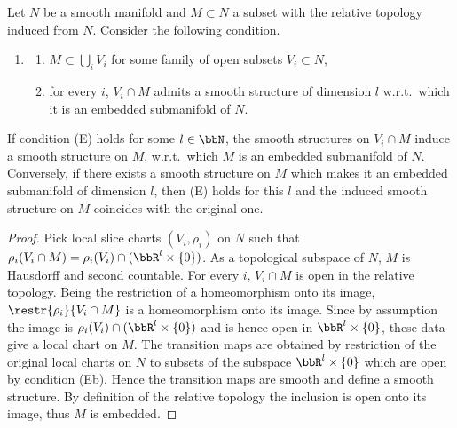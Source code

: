 \begin{lem}\label{prop 1.7.3 RS1}
    Let $N$ be a smooth manifold and $M\subset N$ a subset with the relative topology induced from $N$. Consider the following condition.
    \begin{enumerate}[label=(E)]
        \item \begin{enumerate}[label=(E\alph*)]
            \item $M\subset \bigcup_i V_i$ for some family of open subsets $V_i\subset N$,
            \item for every $i$, $V_i\cap M$ admits a smooth structure of dimension $l$ w.r.t.\ which it is an embedded submanifold of $N$.
        \end{enumerate}
    \end{enumerate}
    If condition (E) holds for some $l\in\bbN$, the smooth structures on $V_i\cap M$ induce a smooth structure on $M$, w.r.t.\ which $M$ is an embedded submanifold of $N$. Conversely, if there exists a smooth structure on $M$ which makes it an embedded submanifold of dimension $l$, then (E) holds for this $l$ and the induced smooth structure on $M$ coincides with the original one.
\end{lem}
\begin{proof}
    Pick local slice charts $(V_i,\rho_i)$ on $N$ such that $\rho_i(V_i\cap M)=\rho_i(V_i)\cap (\bbR^l\times \{0\})$. As a topological subspace of $N$, $M$ is Hausdorff and second countable. For every $i$, $V_i\cap M$ is open in the relative topology. Being the restriction of a homeomorphism onto its image, $\restr{\rho_i}{V_i\cap M}$ is a homeomorphism onto its image. Since by assumption the image is $\rho_i(V_i)\cap (\bbR^l\times\{0\})$ and is hence open in $\bbR^l\times\{0\}$, these data give a local chart on $M$. The transition maps are obtained by restriction of the original local charts on $N$ to subsets of the subspace $\bbR^l\times\{0\}$ which are open by condition (Eb). Hence the transition maps are smooth and define a smooth structure. By definition of the relative topology the inclusion is open onto its image, thus $M$ is embedded.
\end{proof}


